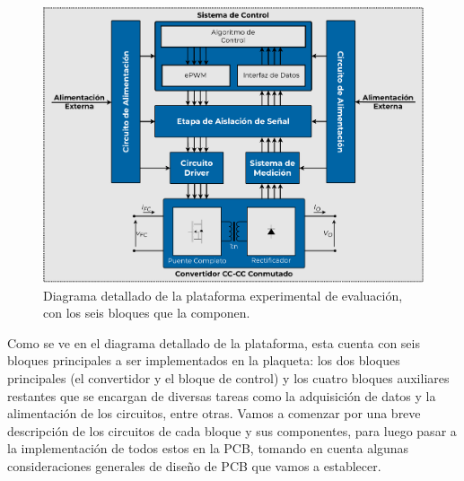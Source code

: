 \begin{figure}[h]
    \centering
    \includegraphics[scale=0.4]{Imagenes/Plataforma Detallada.pdf}
    \caption{Diagrama detallado de la plataforma experimental de evaluación, con los seis bloques que la componen.}
    \label{fig:plataforma_det}
\end{figure}

Como se ve en el diagrama detallado de la plataforma, esta cuenta con seis bloques principales a ser implementados en la plaqueta: los dos bloques principales (el convertidor y el bloque de control) y los cuatro bloques auxiliares restantes que se encargan de diversas tareas como la adquisición de datos y la alimentación de los circuitos, entre otras. Vamos a comenzar por una breve descripción de los circuitos de cada bloque y sus componentes, para luego pasar a la implementación de todos estos en la PCB, tomando en cuenta algunas consideraciones generales de diseño de PCB que vamos a establecer.\\



\newpage



\newpage



\newpage